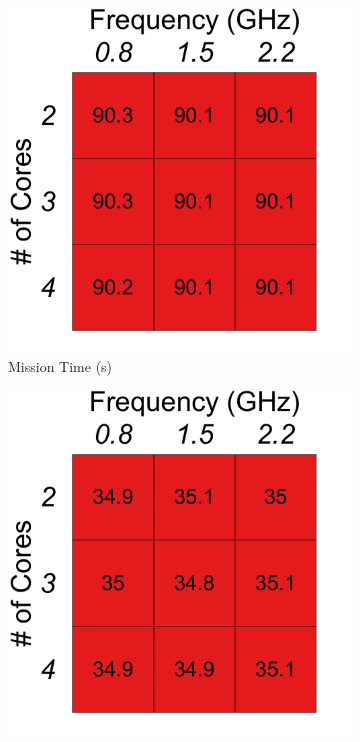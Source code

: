 {\begin{figure}[t!]
\begin{subfigure}[t!]{.3\columnwidth}
    \includegraphics[width=\columnwidth]{figs/scanning_flight_time_operating_point}
    \caption{Mission Time (s)}
    \label{fig:benchmarks:OPA:scanning:time}
    \end{subfigure}
    \begin{subfigure}[t!]{.3\columnwidth}
    \centering
    \includegraphics[width=\columnwidth] {figs/scanning_energy_operating_point}

\end{subfigure}
\end{figure}}
